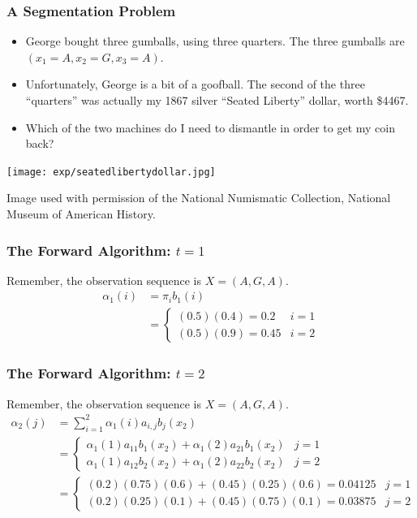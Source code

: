 \documentclass{beamer}
\begin{document}
\begin{frame}
  \frametitle{A Segmentation Problem}

  \begin{itemize}
  \item George bought three gumballs, using three quarters.  The three
    gumballs are $(x_1=A,x_2=G,x_3=A)$.
  \item Unfortunately, George is a bit of a goofball.  The second of
    the three ``quarters'' was actually my 1867 silver ``Seated
    Liberty'' dollar, worth \$4467.
  \item Which of the two machines do I need to dismantle in order to
    get my coin back?
  \end{itemize}
  \centerline{\texttt{[image: exp/seatedlibertydollar.jpg]}}
  \begin{tiny}Image used with permission of the National Numismatic Collection, National Museum of American History.\end{tiny}
\end{frame}

\begin{frame}
  \frametitle{The Forward Algorithm: $t=1$}

  Remember, the observation sequence is $X=(A,G,A)$.
  \begin{align*}
  \alpha_1(i) &= \pi_i b_1(i) \\
  &= \begin{cases} (0.5)(0.4)=0.2  & i=1\\(0.5)(0.9)=0.45 & i=2\end{cases}
  \end{align*}
\end{frame}

\begin{frame}
  \frametitle{The Forward Algorithm: $t=2$}

  Remember, the observation sequence is $X=(A,G,A)$.
  \begin{align*}
  \alpha_2(j) &= \sum_{i=1}^2 \alpha_1(i)a_{i,j}b_j(x_2)\\
  &= \begin{cases}
    \alpha_1(1)a_{11}b_1(x_2)+\alpha_1(2)a_{21}b_1(x_2) & j=1\\
    \alpha_1(1)a_{12}b_2(x_2)+\alpha_1(2)a_{22}b_2(x_2) & j=2
  \end{cases}\\
  &= \begin{cases}
    (0.2)(0.75)(0.6)+(0.45)(0.25)(0.6)=0.04125  & j=1\\
    (0.2)(0.25)(0.1)+(0.45)(0.75)(0.1)=0.03875 &  j=2
  \end{cases}
  \end{align*}
  
\end{frame}
\end{document}

